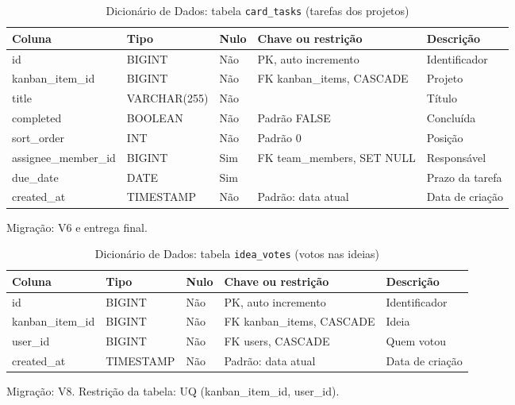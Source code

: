 \begin{table}[H]
\centering
\footnotesize
\caption{Dicionário de Dados: tabela \texttt{card\_\allowbreak{}tasks} (tarefas dos projetos)}
\label{tab:dd-card-tasks}
\begin{tabular}{|>{\raggedright\arraybackslash}p{3.0cm}|>{\raggedright\arraybackslash}p{3.2cm}|>{\centering\arraybackslash}p{0.8cm}|>{\raggedright\arraybackslash}p{3.0cm}|>{\raggedright\arraybackslash}p{3.8cm}|}
\hline
\textbf{Coluna} & \textbf{Tipo} & \textbf{Nulo} & \textbf{Chave ou restrição} & \textbf{Descrição} \\
\hline
id & BIGINT & Não & PK, auto incremento & Identificador \\
\hline
kanban\_\allowbreak{}item\_\allowbreak{}id & BIGINT & Não & FK kanban\_\allowbreak{}items, CASCADE & Projeto \\
\hline
title & VARCHAR(255) & Não &  & Título \\
\hline
completed & BOOLEAN & Não & Padrão FALSE & Concluída \\
\hline
sort\_\allowbreak{}order & INT & Não & Padrão 0 & Posição \\
\hline
assignee\_\allowbreak{}member\_\allowbreak{}id & BIGINT & Sim & FK team\_\allowbreak{}members, SET NULL & Responsável \\
\hline
due\_\allowbreak{}date & DATE & Sim &  & Prazo da tarefa \\
\hline
created\_\allowbreak{}at & TIMESTAMP & Não & Padrão: data atual & Data de criação \\
\hline
\end{tabular}
\par\footnotesize Migração: V6 e entrega final.
\end{table}

\begin{table}[H]
\centering
\footnotesize
\caption{Dicionário de Dados: tabela \texttt{idea\_\allowbreak{}votes} (votos nas ideias)}
\label{tab:dd-idea-votes}
\begin{tabular}{|>{\raggedright\arraybackslash}p{3.0cm}|>{\raggedright\arraybackslash}p{3.2cm}|>{\centering\arraybackslash}p{0.8cm}|>{\raggedright\arraybackslash}p{3.0cm}|>{\raggedright\arraybackslash}p{3.8cm}|}
\hline
\textbf{Coluna} & \textbf{Tipo} & \textbf{Nulo} & \textbf{Chave ou restrição} & \textbf{Descrição} \\
\hline
id & BIGINT & Não & PK, auto incremento & Identificador \\
\hline
kanban\_\allowbreak{}item\_\allowbreak{}id & BIGINT & Não & FK kanban\_\allowbreak{}items, CASCADE & Ideia \\
\hline
user\_\allowbreak{}id & BIGINT & Não & FK users, CASCADE & Quem votou \\
\hline
created\_\allowbreak{}at & TIMESTAMP & Não & Padrão: data atual & Data de criação \\
\hline
\end{tabular}
\par\footnotesize Migração: V8. Restrição da tabela: UQ (kanban\_\allowbreak{}item\_\allowbreak{}id, user\_\allowbreak{}id).
\end{table}

